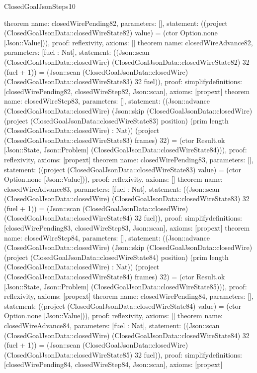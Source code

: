 \begin{lexlean}{ClosedGoalJsonSteps10}
\begin{semanticmodule}
{}
theorem{
 name: closedWirePending82, parameters: [],
 statement: ((project (ClosedGoalJsonData::closedWireState82) value) = (ctor Option.none [Json::Value])), proof: reflexivity{}, axioms: []
}
theorem{
 name: closedWireAdvance82, parameters: [fuel : Nat],
 statement: ((Json::scan (ClosedGoalJsonData::closedWire) (ClosedGoalJsonData::closedWireState82) 32 (fuel + 1)) = (Json::scan (ClosedGoalJsonData::closedWire) (ClosedGoalJsonData::closedWireState83) 32 fuel)), proof: simplify{definitions: [closedWirePending82, closedWireStep82, Json::scan]}, axioms: [propext]
}
theorem{
 name: closedWireStep83, parameters: [],
 statement: ((Json::advance (ClosedGoalJsonData::closedWire) (Json::skip (ClosedGoalJsonData::closedWire) (project (ClosedGoalJsonData::closedWireState83) position) (prim length (ClosedGoalJsonData::closedWire) : Nat)) (project (ClosedGoalJsonData::closedWireState83) frames) 32) = (ctor Result.ok [Json::State, Json::Problem] (ClosedGoalJsonData::closedWireState84))), proof: reflexivity{}, axioms: [propext]
}
theorem{
 name: closedWirePending83, parameters: [],
 statement: ((project (ClosedGoalJsonData::closedWireState83) value) = (ctor Option.none [Json::Value])), proof: reflexivity{}, axioms: []
}
theorem{
 name: closedWireAdvance83, parameters: [fuel : Nat],
 statement: ((Json::scan (ClosedGoalJsonData::closedWire) (ClosedGoalJsonData::closedWireState83) 32 (fuel + 1)) = (Json::scan (ClosedGoalJsonData::closedWire) (ClosedGoalJsonData::closedWireState84) 32 fuel)), proof: simplify{definitions: [closedWirePending83, closedWireStep83, Json::scan]}, axioms: [propext]
}
theorem{
 name: closedWireStep84, parameters: [],
 statement: ((Json::advance (ClosedGoalJsonData::closedWire) (Json::skip (ClosedGoalJsonData::closedWire) (project (ClosedGoalJsonData::closedWireState84) position) (prim length (ClosedGoalJsonData::closedWire) : Nat)) (project (ClosedGoalJsonData::closedWireState84) frames) 32) = (ctor Result.ok [Json::State, Json::Problem] (ClosedGoalJsonData::closedWireState85))), proof: reflexivity{}, axioms: [propext]
}
theorem{
 name: closedWirePending84, parameters: [],
 statement: ((project (ClosedGoalJsonData::closedWireState84) value) = (ctor Option.none [Json::Value])), proof: reflexivity{}, axioms: []
}
theorem{
 name: closedWireAdvance84, parameters: [fuel : Nat],
 statement: ((Json::scan (ClosedGoalJsonData::closedWire) (ClosedGoalJsonData::closedWireState84) 32 (fuel + 1)) = (Json::scan (ClosedGoalJsonData::closedWire) (ClosedGoalJsonData::closedWireState85) 32 fuel)), proof: simplify{definitions: [closedWirePending84, closedWireStep84, Json::scan]}, axioms: [propext]
}
\end{semanticmodule}
\end{lexlean}

